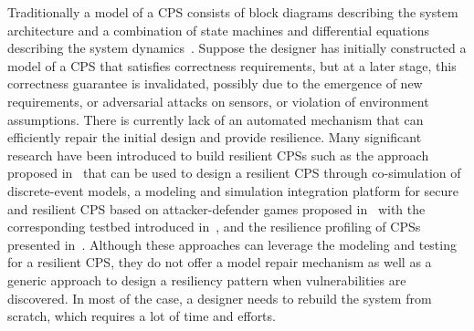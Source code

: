 %
Traditionally a model of a CPS consists of block diagrams describing the system architecture and a combination of state machines and differential equations describing the system dynamics~\cite{alur1995algorithmic}. Suppose the designer has initially constructed a model of a CPS that satisfies correctness requirements, but at a later stage, this correctness guarantee is invalidated, possibly due to the emergence of new requirements, or adversarial attacks on sensors, or violation of environment assumptions. There is currently lack of an automated mechanism that can efficiently repair the initial design and provide resilience.  
%
%
Many significant research have been introduced to build resilient CPSs such as the approach proposed in~\cite{fitzgerald2012rigorous} that can be used to design a resilient CPS through co-simulation of discrete-event models, a modeling and simulation integration platform for secure and resilient CPS based on attacker-defender games proposed in~\cite{koutsoukos2018sure} with the corresponding testbed introduced in~\cite{neema2018integrated}, and the resilience profiling of CPSs presented in~\cite{jackson28resilience}. Although these approaches can leverage the modeling and testing for a resilient CPS, they do not offer a model repair mechanism as well as a generic approach to design a resiliency pattern when vulnerabilities are discovered. In most of the case, a designer needs to rebuild the system from scratch, which requires a lot of time and efforts.
%
%
%
%
%

%
%

